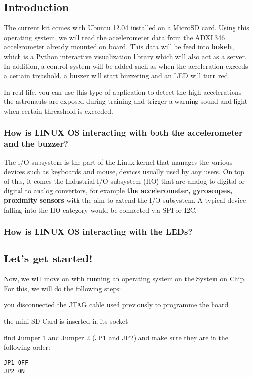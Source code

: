 \subsection{Introduction}

The current kit comes with Ubuntu 12.04 installed on a MicroSD card. Using this 
operating system, we will read the accelerometer data from the ADXL346 accelerometer
already mounted on board. This data will be feed into \textbf{bokeh}, which is a Python interactive visualization library which will also act as a server. In addition,
a control system will be added such as when the acceleration exceeds a certain treashold, a buzzer will start buzzering and an LED will turn red.

In real life, you can use this type of application to detect the high accelerations the astronauts are exposed during training and trigger a warning sound and light when certain threashold is exceeded.


\subsubsection{How is LINUX OS interacting with both the accelerometer and the buzzer?}

The I/O subsystem is the part of the Linux kernel that manages the various devices such as keyboards and mouse, devices usually used by any users. On top of this, it comes the Industrial I/O subsystem (IIO) that are analog to digital or digital to analog convertors, for example \textbf{the accelerometer, gyroscopes, proximity sensors} with the aim to extend the I/O subsystem. A typical device falling into the IIO category would be connected via SPI or I2C.




\subsubsection{How is LINUX OS interacting with the LEDs?}


\subsection{Let's get started!}

Now, we will move on with running an operating system on the System on Chip. For this, we will do the following steps:
\begin{myitemize}
\item you disconnected the JTAG cable used previously to programme the board
\item the mini SD Card is inserted in its socket
\item find Jumper 1 and Jumper 2 (JP1 and JP2) and make sure they are in the following order:
\begin{verbatim}
JP1 OFF 
JP2 ON
\end{verbatim}
\end{myitemize}


